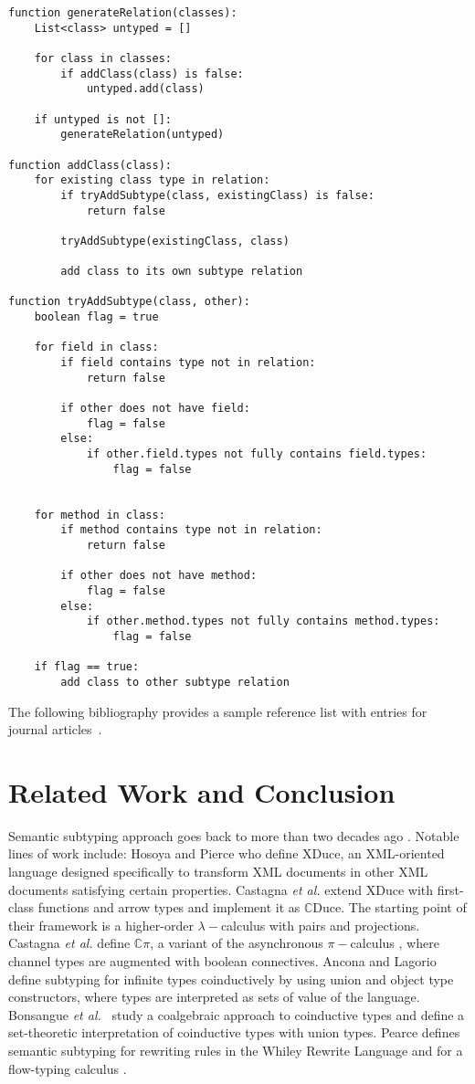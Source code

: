 \documentclass[runningheads]{llncs}
\begin{document}
\begin{verbatim}
function generateRelation(classes):
    List<class> untyped = []

    for class in classes:
        if addClass(class) is false:
            untyped.add(class)
    
    if untyped is not []:
        generateRelation(untyped)

function addClass(class):
    for existing class type in relation:
        if tryAddSubtype(class, existingClass) is false:
            return false

        tryAddSubtype(existingClass, class)        

        add class to its own subtype relation

function tryAddSubtype(class, other):
    boolean flag = true

    for field in class:
        if field contains type not in relation:
            return false

        if other does not have field:
            flag = false
        else:
            if other.field.types not fully contains field.types:
                flag = false 


    for method in class:
        if method contains type not in relation:
            return false

        if other does not have method:
            flag = false
        else:
            if other.method.types not fully contains method.types:
                flag = false

    if flag == true:
        add class to other subtype relation
\end{verbatim}

The following bibliography provides
a sample reference list with entries for journal
articles~\cite{Dardha2017}.

\section{Related Work and Conclusion}
\label{sec:conclusion}
Semantic subtyping approach goes back to more than two decades ago \cite{Aiken,Damm}.
Notable lines of work include:
Hosoya and Pierce \cite{XML1,XML2,XML3} who define XDuce, an XML-oriented language designed specifically to transform XML documents in other XML documents satisfying certain properties.
Castagna \emph{et al.} \cite{gentle,Cas05,FCB08} extend XDuce with first-class functions and arrow types and implement it as $\mathbb{C}$Duce. The starting point of their framework is a higher-order $\lambda-$calculus with pairs and projections.
Castagna \emph{et al.} \cite{Cpi} define $\mathbb{C}\pi$, a variant of the asynchronous $\pi-$calculus \cite{sangiorgi}, where channel types are augmented with boolean connectives.
Ancona and Lagorio~\cite{AL10} define subtyping for infinite types coinductively by using union and object type constructors, where types are interpreted as sets of value of the language.
Bonsangue \emph{et al.}~\cite{BRABR14} study a coalgebraic approach to coinductive types and define a set-theoretic interpretation of coinductive types with union types.
Pearce \cite{Pearce19} defines semantic subtyping for rewriting rules in the Whiley Rewrite Language and for a flow-typing calculus  \cite{Pearce13}.
\end{document}
